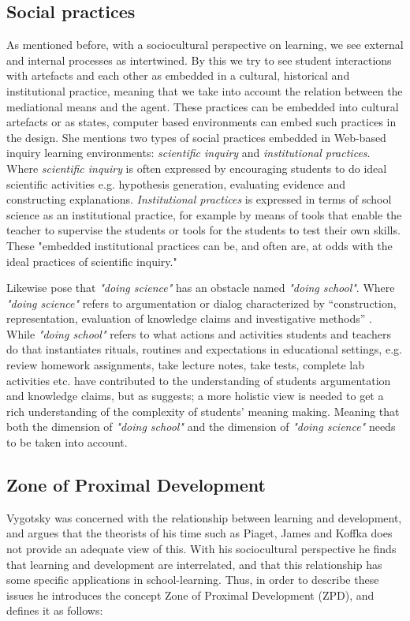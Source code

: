 \subsection{Social practices}
As mentioned before, with a sociocultural perspective on learning, we see external and internal processes as intertwined. By this we try to see student interactions with artefacts and each other as embedded in a cultural, historical and institutional practice, meaning that we take into account the relation between the mediational means and the agent. These practices can be embedded into cultural artefacts or as \citet{furberg2009socio} states, computer based environments can embed such practices in the design. She mentions two types of social practices embedded in Web-based inquiry learning environments: \emph{scientific inquiry} and \emph{institutional practices}.  Where \emph{scientific inquiry} is often expressed by encouraging students to do ideal scientific activities e.g. hypothesis generation, evaluating evidence and constructing explanations. \emph{Institutional practices} is expressed in terms of school science as an institutional practice, for example by means of tools that enable the teacher to supervise the students or tools for the students to test their own skills. These "embedded institutional practices can be, and often are, at odds with the ideal practices of scientific inquiry." \citetext{Cinn \& Malhotra 2002, referenced in \citealp{furberg2009socio}} 

Likewise \citet{jimenez2000doing} pose that \emph{"doing science"} has an obstacle named \emph{"doing school"}. Where \emph{"doing science"} refers to argumentation or dialog characterized by “construction, representation, evaluation of knowledge claims and investigative methods” \citep{jimenez2000doing}. While \emph{"doing school"} refers to what actions and activities students and teachers do that instantiates rituals, routines and expectations in educational settings, e.g. review homework assignments, take lecture notes, take tests, complete lab activities etc. \citeauthor{jimenez2000doing} have contributed to the understanding of students argumentation and knowledge claims, but as \citet*{furberg2008students} suggests; a more holistic view is needed to get a rich understanding of the complexity of students' meaning making. Meaning that both the dimension of \emph{"doing school"} and the dimension of \emph{"doing science"} needs to be taken into account. 

\subsection{Zone of Proximal Development}
Vygotsky was concerned with the relationship between learning and development, and argues that the theorists of his time such as Piaget, James and Koffka does not provide an adequate view of this. With his sociocultural perspective he finds that learning and development are interrelated, and that this relationship has some specific applications in school-learning. \citep[p. 84]{vygotskiui1978mind} Thus, in order to describe these issues he introduces the concept Zone of Proximal Development (ZPD), and defines it as follows:

